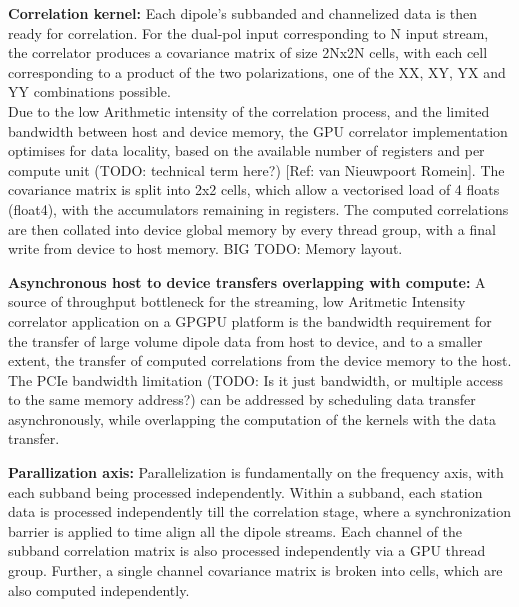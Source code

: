 \documentclass{ws-jai}
\begin{document}
\textbf {Correlation kernel:}
Each dipole's subbanded and channelized data  is then ready for correlation. For
the dual-pol  input corresponding to N  input stream, the correlator  produces a
covariance matrix of size 2Nx2N cells, with each cell corresponding to a product
of the two polarizations, one of the XX, XY, YX and YY combinations possible.\\

Due to the low Arithmetic intensity  of the correlation process, and the limited
bandwidth  between host  and device  memory, the  GPU correlator  implementation
optimises for data locality, based on  the available number of registers and per
compute  unit (TODO:  technical term  here?) [Ref:  van Nieuwpoort  Romein]. The
covariance matrix is  split into 2x2 cells,  which allow a vectorised  load of 4
floats  (float4), with  the accumulators  remaining in  registers. The  computed
correlations are then collated into device  global memory by every thread group,
with a final write from device to host memory. BIG TODO: Memory layout.

\textbf  {Asynchronous host  to device  transfers overlapping  with compute:}  A
source  of throughput  bottleneck  for the  streaming,  low Aritmetic  Intensity
correlator application on a GPGPU platform  is the bandwidth requirement for the
transfer of  large volume  dipole data  from host  to device,  and to  a smaller
extent, the  transfer of  computed correlations  from the  device memory  to the
host. The  PCIe bandwidth limitation  (TODO: Is  it just bandwidth,  or multiple
access to the same memory address?) can be addressed by scheduling data transfer
asynchronously, while overlapping  the computation of the kernels  with the data
transfer.


\textbf {Parallization axis:} Parallelization  is fundamentally on the frequency
axis, with  each subband being  processed independently. Within a  subband, each
station  data is  processed independently  till the  correlation stage,  where a
synchronization barrier  is applied to time  align all the dipole  streams. Each
channel of the subband correlation matrix  is also processed independently via a
GPU thread  group. Further, a  single channel  covariance matrix is  broken into
cells, which are also computed independently.
\end{document}
